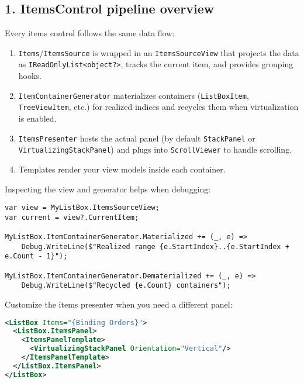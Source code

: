 \subsection{1. ItemsControl pipeline
overview}\label{itemscontrol-pipeline-overview}

Every items control follows the same data flow:

\begin{enumerate}
\def\labelenumi{\arabic{enumi}.}
\tightlist
\item
  \passthrough{\lstinline!Items!}/\passthrough{\lstinline!ItemsSource!}
  is wrapped in an \passthrough{\lstinline!ItemsSourceView!} that
  projects the data as \passthrough{\lstinline!IReadOnlyList<object?>!},
  tracks the current item, and provides grouping hooks.
\item
  \passthrough{\lstinline!ItemContainerGenerator!} materializes
  containers (\passthrough{\lstinline!ListBoxItem!},
  \passthrough{\lstinline!TreeViewItem!}, etc.) for realized indices and
  recycles them when virtualization is enabled.
\item
  \passthrough{\lstinline!ItemsPresenter!} hosts the actual panel (by
  default \passthrough{\lstinline!StackPanel!} or
  \passthrough{\lstinline!VirtualizingStackPanel!}) and plugs into
  \passthrough{\lstinline!ScrollViewer!} to handle scrolling.
\item
  Templates render your view models inside each container.
\end{enumerate}

Inspecting the view and generator helps when debugging:

\begin{lstlisting}
var view = MyListBox.ItemsSourceView;
var current = view?.CurrentItem;

MyListBox.ItemContainerGenerator.Materialized += (_, e) =>
    Debug.WriteLine($"Realized range {e.StartIndex}..{e.StartIndex + e.Count - 1}");

MyListBox.ItemContainerGenerator.Dematerialized += (_, e) =>
    Debug.WriteLine($"Recycled {e.Count} containers");
\end{lstlisting}

Customize the items presenter when you need a different panel:

\begin{lstlisting}[language=XML]
<ListBox Items="{Binding Orders}">
  <ListBox.ItemsPanel>
    <ItemsPanelTemplate>
      <VirtualizingStackPanel Orientation="Vertical"/>
    </ItemsPanelTemplate>
  </ListBox.ItemsPanel>
</ListBox>
\end{lstlisting}

